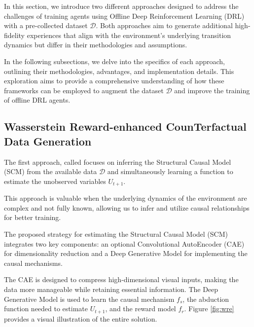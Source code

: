 In this section, we introduce two different approaches designed to
address the challenges of training agents using Offline
Deep Reinforcement Learning (DRL) with a pre-collected dataset \( \mathcal{D} \).
Both approaches aim to generate additional high-fidelity experiences
that align with the environment's underlying transition dynamics
but differ in their methodologies and assumptions.

In the following subsections, we delve into the specifics
of each approach, outlining their methodologies, advantages, and
implementation details. This exploration aims to
provide a comprehensive understanding of how these
frameworks can be employed to augment the dataset \( \mathcal{D} \) and improve
the training of offline DRL agents.

\subsection{Wasserstein Reward-enhanced CounTerfactual\\ Data Generation}
\label{sec:wre}

The first approach, called  focuses on inferring the Structural Causal Model
(SCM) from the available data \( \mathcal{D} \) and simultaneously learning
a function to estimate the unobserved variables $U_{t+1}$.

This approach is valuable when the underlying dynamics of the
environment are complex and not fully known, allowing us to
infer and utilize causal relationships for better training.

The proposed strategy for estimating the Structural Causal Model (SCM)
integrates two key components: an optional Convolutional AutoEncoder (CAE)
for dimensionality reduction and a Deep Generative Model for
implementing the causal mechanisms.

The CAE is designed to compress high-dimensional visual inputs,
making the data more manageable while retaining essential information.
The Deep Generative Model is used to learn the causal mechanism \( f_s \),
the abduction function needed to estimate \( U_{t+1} \),
and the reward model \( f_r \).
Figure \ref{fig:wre} provides a visual illustration of the entire solution.

